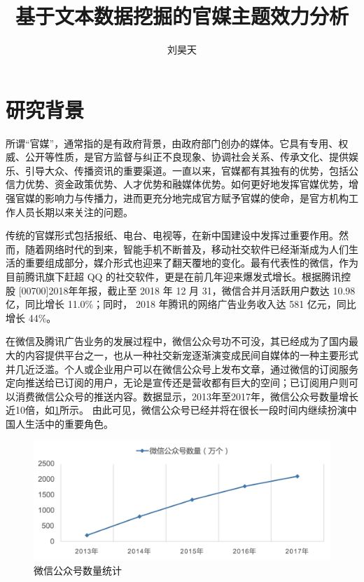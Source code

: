 \documentclass[a4paper,12pt,UTF8]{article}
\title{基于文本数据挖掘的官媒主题效力分析}
\author{刘昊天}
\begin{document}
    \maketitle
    \section{研究背景}
    所谓“官媒”，通常指的是有政府背景，由政府部门创办的媒体。它具有专用、权威、公开等性质，是官方监督与纠正不良现象、协调社会关系、传承文化、提供娱乐、引导大众、传播资讯的重要渠道\cite{guanmei}。一直以来，官媒都有其独有的优势，包括公信力优势、资金政策优势、人才优势和融媒体优势\cite{李志明2017区域性官媒和自媒体微信公众号差异化分析}。如何更好地发挥官媒优势，增强官媒的影响力与传播力，进而更充分地完成官方赋予官媒的使命，是官方机构工作人员长期以来关注的问题。

    传统的官媒形式包括报纸、电台、电视等，在新中国建设中发挥过重要作用。然而，随着网络时代的到来，智能手机不断普及，移动社交软件已经渐渐成为人们生活的重要组成部分，媒介形式也迎来了翻天覆地的变化。最有代表性的微信，作为目前腾讯旗下赶超 QQ 的社交软件，更是在前几年迎来爆发式增长。根据腾讯控股 [00700]2018年年报，截止至 2018 年 12 月 31，微信合并月活跃用户数达 10.98 亿，同比增长 11.0\%；同时， 2018 年腾讯的网络广告业务收入达 581 亿元，同比增长 44\%。

    在微信及腾讯广告业务的发展过程中，微信公众号功不可没，其已经成为了国内最大的内容提供平台之一，也从一种社交新宠逐渐演变成民间自媒体的一种主要形式并几近泛滥。个人或企业用户可以在微信公众号上发布文章，通过微信的订阅服务定向推送给已订阅的用户，无论是宣传还是营收都有巨大的空间；已订阅用户则可以消费微信公众号的推送内容。数据显示，2013年至2017年，微信公众号数量增长近10倍，如\cref{fig:pub}所示。
    由此可见，微信公众号已经并将在很长一段时间内继续扮演中国人生活中的重要角色。

    \begin{figure}
      \centering
      \includegraphics[width=0.9\linewidth]{pub.png}
      \caption{微信公众号数量统计}
      \label{fig:pub}
    \end{figure}
\end{document}
